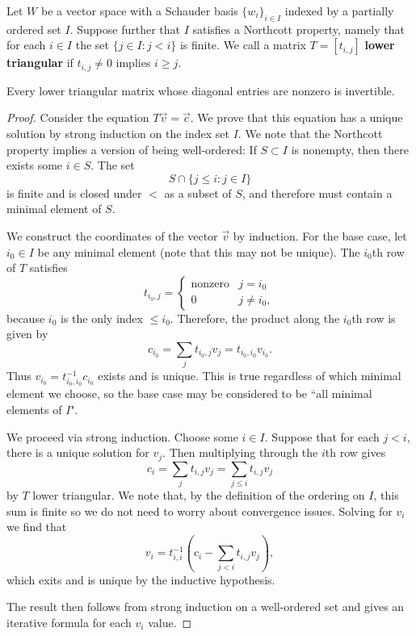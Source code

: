 \documentclass[12pt]{amsart}
\theoremstyle{plain}
\begin{document}
\begin{lemma}\label{lem:lowertri}
Let $W$ be a vector space with a Schauder basis $\{w_i\}_{i\in I}$ indexed by a partially ordered set $I$. Suppose further that $I$ satisfies a Northcott property, namely that for each $i\in I$ the set $\{j\in I : j < i\}$ is finite. We call a matrix $T = [t_{i,j}]$ \textbf{lower triangular} if $t_{i,j}\ne 0$ implies $i \ge j$.

Every lower triangular matrix whose diagonal entries are nonzero is invertible.
\end{lemma}

\begin{proof}
Consider the equation $T\vec{v} = \vec{c}$. We prove that this equation has a unique solution by strong induction on the index set $I$. We note that the Northcott property implies a version of being well-ordered: If $S\subset I$ is nonempty, then there exists some $i\in S$. The set
\[
S\cap \{j \le i : j\in I\}
\]
is finite and is closed under $<$ as a subset of $S$, and therefore must contain a minimal element of $S$.

We construct the coordinates of the vector $\vec{v}$ by induction. For the base case, let $i_0\in I$ be any minimal element (note that this may not be unique). The $i_0$th row of $T$ satisfies
\[
t_{i_0,j} = \begin{cases}
\text{nonzero} & j=i_0\\
0 & j\ne i_0,
\end{cases}
\]
because $i_0$ is the only index $\le i_0$. Therefore, the product along the $i_0$th row is given by
\[
c_{i_0} = \sum_{j} t_{i_0,j}v_{j} = t_{i_0,i_0} v_{i_0}.
\]
Thus $v_{i_0} = t_{i_0,i_0}^{-1} c_{i_0}$ exists and is unique. This is true regardless of which minimal element we choose, so the base case may be considered to be ``all minimal elements of $I$".

We proceed via strong induction. Choose some $i\in I$. Suppose that for each $j < i$, there is a unique solution for $v_j$. Then multiplying through the $i$th row gives
\[
c_i = \sum_j t_{i,j}v_j = \sum_{j\le i}t_{i,j} v_j
\]
by $T$ lower triangular. We note that, by the definition of the ordering on $I$, this sum is finite so we do not need to worry about convergence issues. Solving for $v_i$ we find that
\[
v_i = t_{i,i}^{-1}\left(c_i - \sum_{j<i}t_{i,j} v_j\right),
\]
which exits and is unique by the inductive hypothesis.

The result then follows from strong induction on a well-ordered set and gives an iterative formula for each $v_i$ value.
\end{proof}
\end{document}
